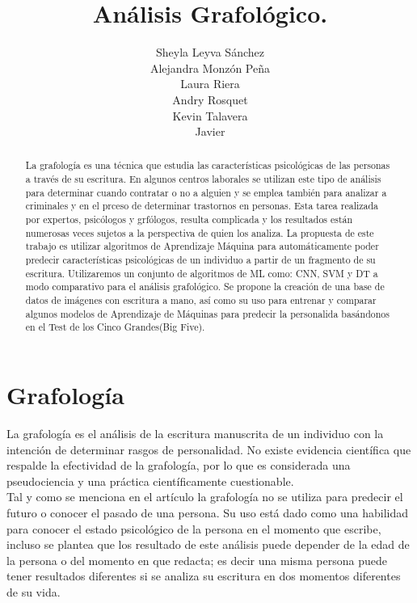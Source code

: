 \documentclass[10pt, a4paper]{article}
\begin{document}
\title{An\'alisis Grafol\'ogico.}
\author{Sheyla Leyva S\'anchez \\ Alejandra Monz\'on Pe\~na \\ Laura Riera \\ Andry Rosquet \\ Kevin Talavera \\ Javier}
\date{}
\maketitle

    \begin{abstract}
        La grafología es una técnica que estudia las características psicológicas de las personas a través de su escritura. 
        En algunos centros laborales se utilizan este tipo de análisis para determinar cuando contratar o no a alguien y se emplea también 
        para analizar a criminales y en el prceso de determinar trastornos en personas. Esta tarea realizada por expertos,
        psicólogos y grfólogos, resulta complicada y los resultados están numerosas veces sujetos a la perspectiva de quien los analiza. La propuesta de este trabajo es 
        utilizar algoritmos de Aprendizaje Máquina para automáticamente poder predecir características psicológicas de un individuo a partir de un fragmento de su escritura. 
        Utilizaremos un conjunto de algoritmos de ML como: CNN, SVM y DT a modo comparativo para el análisis grafológico. 
        Se propone la creaci\'on de una base de datos de im\'agenes con escritura a mano, as\'i como su uso para entrenar y comparar algunos modelos de Aprendizaje de M\'aquinas para predecir la personalida bas\'andonos en el Test de los Cinco Grandes(Big Five).
    \end{abstract}
    
    \section{Grafolog\'ia}
    
    La grafología es el análisis de la escritura manuscrita de un individuo con la intención de determinar rasgos de personalidad. 
    No existe evidencia científica que respalde la efectividad de la grafología, por lo que es considerada una pseudociencia 
    y una práctica científicamente cuestionable.\\ 

    Tal y como se menciona en el art\'iculo \cite{19} la grafolog\'ia no se utiliza para predecir el futuro o conocer el pasado de una persona. Su uso 
    est\'a dado como una habilidad para conocer el estado psicol\'ogico de la persona en el momento que escribe, incluso se plantea que los resultado de este an\'alisis 
    puede depender de la edad de la persona o del momento en que redacta; es decir una misma persona puede tener resultados diferentes si se analiza su escritura en dos momentos 
    diferentes de su vida.\\
    
\end{document}
